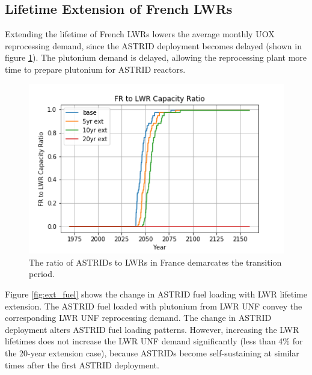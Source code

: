 \subsection{Lifetime Extension of French \glspl{LWR}}\label{sec:life}
Extending the lifetime of French \glspl{LWR} lowers the average
monthly \gls{UOX} reprocessing demand, since the \gls{ASTRID} deployment becomes 
delayed (shown in figure \ref{fig:pow_diff}). The plutonium demand is delayed,
 allowing the reprocessing plant more time to prepare plutonium for \gls{ASTRID} reactors.

\begin{figure}[htbp!]
    \begin{center}
        \includegraphics[scale=0.7]{./images/sensitivity/pow_ratio.png}
    \end{center}
    \caption{The ratio of \glspl{ASTRID} to \glspl{LWR} in France demarcates 
    the transition period.}
    \label{fig:pow_diff}
\end{figure}


Figure \ref{fig:ext_fuel} shows the change in \gls{ASTRID} fuel loading with
\gls{LWR} lifetime extension. The \gls{ASTRID} fuel loaded with plutonium
from \gls{LWR} \gls{UNF} convey the corresponding \gls{LWR} \gls{UNF} reprocessing demand.
The change in \gls{ASTRID} deployment alters \gls{ASTRID} fuel loading patterns.
However, increasing the \gls{LWR} lifetimes
does not increase the \gls{LWR} \gls{UNF} demand significantly (less than 4\%
for the 20-year extension case),
because \glspl{ASTRID} become self-sustaining at similar times after the first
\gls{ASTRID} deployment.

